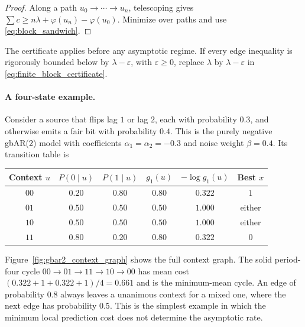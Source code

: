 \documentclass[11pt,a4paper]{article}
\begin{document}
\begin{proof}
Along a path $u_0\to\cdots\to u_n$, telescoping gives
$\sum c\ge n\lambda+\varphi(u_n)-\varphi(u_0)$.
Minimize over paths and use \eqref{eq:block_sandwich}.
\end{proof}

The certificate applies before any asymptotic regime.  If every edge
inequality is rigorously bounded below by $\lambda-\varepsilon$,
with $\varepsilon\ge0$, replace $\lambda$ by
$\lambda-\varepsilon$ in \eqref{eq:finite_block_certificate}.

\paragraph{A four-state example.}
Consider a source that flips lag $1$ or lag $2$, each with
probability $0.3$, and otherwise emits a fair bit with probability
$0.4$.  This is the purely negative gbAR(2) model with coefficients
$\alpha_1=\alpha_2=-0.3$ and noise weight $\beta=0.4$.  Its
transition table is
\begin{center}
\scriptsize
\begin{tabular}{cccccc}
\toprule
Context $u$ & $P(0\mid u)$ & $P(1\mid u)$ & $g_1(u)$ & $-\log g_1(u)$ & Best $x$\\
\midrule
$00$ & $0.20$ & $0.80$ & $0.80$ & $0.322$ & $1$\\
$01$ & $0.50$ & $0.50$ & $0.50$ & $1.000$ & either\\
$10$ & $0.50$ & $0.50$ & $0.50$ & $1.000$ & either\\
$11$ & $0.80$ & $0.20$ & $0.80$ & $0.322$ & $0$\\
\bottomrule
\end{tabular}
\end{center}
Figure~\ref{fig:gbar2_context_graph} shows the full context graph.  The
solid period-four cycle
$00\to01\to11\to10\to00$ has mean cost
$(0.322+1+0.322+1)/4=0.661$ and is the minimum-mean cycle.  An edge of probability $0.8$ always
leaves a unanimous context
for a mixed one, where the next edge has probability $0.5$.  This is the
simplest example in which the minimum local prediction cost does not
determine the asymptotic rate.
\end{document}
